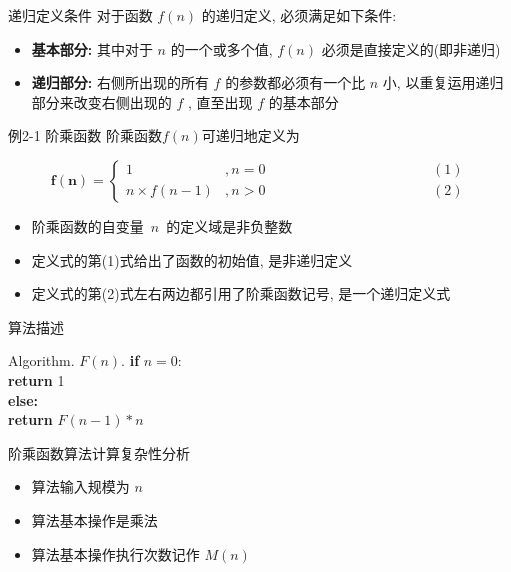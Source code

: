 \documentclass[fontset=fandol,UTF8,fleqn]{beamer}
\begin{document}
\begin{frame}{递归定义条件}
对于函数 $f(n)$ 的递归定义, 必须满足如下条件: 
\begin{itemize}[<+-|alert@+>]
\item \textbf{基本部分:}  其中对于 $n$ 的一个或多个值, $f(n)$ 必须是直接定义的(即非递归)  
\item \textbf{递归部分:} 右侧所出现的所有 $f$ 的参数都必须有一个比 $n$ 小, 以重复运用递归部分来改变右侧出现的 $f$ , 直至出现 $f$ 的基本部分 
\end{itemize}
\end{frame}

\begin{frame}{例2-1 阶乘函数}
  阶乘函数$f(n)$可递归地定义为
  \begin{exampleblock}{}
\begin{displaymath}
\boldsymbol{  f(n)}=\left\{\begin{array}{ll}
1 & ,n=0 \hspace{5cm}  (1) \\
n\times f(n-1) & ,n >0 \hspace{5cm} (2) 
\end{array}\right. 
\end{displaymath}
\end{exampleblock}
\begin{itemize}[<+-|alert@+>]
\item 阶乘函数的自变量~$n$~的定义域是非负整数 
\item 定义式的第(1)式给出了函数的初始值, 是非递归定义 
\item 定义式的第(2)式左右两边都引用了阶乘函数记号, 是一个递归定义式 
\end{itemize}
\end{frame}

\begin{frame}{算法描述}
  \begin{exampleblock}{Algorithm. $F(n)$.}
\qquad \textbf{if} $n = 0$: \\
\qquad\qquad \textbf{return} 1 \\
\qquad \textbf{else:} \\
\qquad\qquad \textbf{return} $F(n-1)*n$
\end{exampleblock}
\end{frame}

\begin{frame}{阶乘函数算法计算复杂性分析}
\begin{itemize}[<+-|alert@+>]
\item 算法输入规模为 $n$  
\item 算法基本操作是乘法  
\item 算法基本操作执行次数记作 $M(n)$ 
\end{itemize}
\end{frame}
\end{document}
